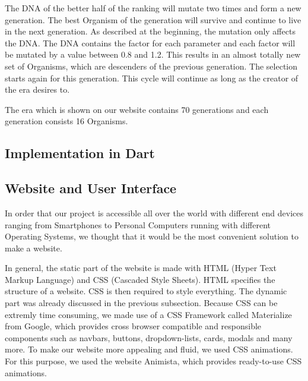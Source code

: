 The DNA of the better half of the ranking will mutate two times and form a new generation. The best Organism of the generation will survive and continue to live in the next generation.
As described at the beginning, the mutation only affects the DNA. The DNA contains the factor for each parameter and each factor will be mutated by a value between 0.8 and 1.2. This results in an almost totally new set of Organisms, which are descenders of the previous generation. The selection starts again for this generation.
This cycle will continue as long as the creator of the era desires to. 

%
The era which is shown on our website contains 70 generations and each generation consists 16 Organisms.




\subsection{Implementation in Dart}


\subsection{Website and User Interface}
In order that our project is accessible all over the world with different end devices ranging from Smartphones to Personal Computers running with different Operating Systems, we thought that it would be the most convenient solution to make a website. 

In general, the static part of the website is made with HTML (Hyper Text Markup Language) and CSS (Cascaded Style Sheets). HTML specifies the structure of a website.  CSS is then required to style everything. The dynamic part was already discussed in the previous subsection. 
Because CSS can be extremly time consuming, we made use of a CSS Framework called Materialize from Google, which provides cross browser compatible and responsible components such as navbars, buttons, dropdown-lists, cards, modals and many more. To make our website more appealing and fluid, we used CSS animations. For this purpose, we used the website Animista, which provides ready-to-use CSS animations.

